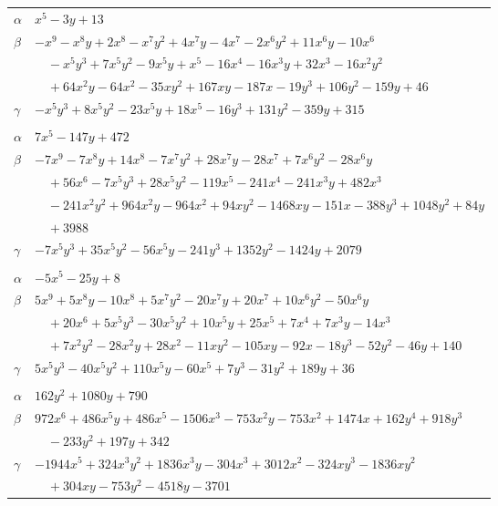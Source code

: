 \documentclass[11pt]{article}
\begin{document}
\begin{longtable}{@{}ll@{}}
$\alpha$ & $x^{5}-3y+13$\\
$\beta$ & $-x^{9}-x^{8}y+2x^{8}-x^{7}y^{2}+4x^{7}y-4x^{7}-2x^{6}y^{2}+11x^{6}y-10x^{6}$\\
 & $\quad -x^{5}y^{3}+7x^{5}y^{2}-9x^{5}y+x^{5}-16x^{4}-16x^{3}y+32x^{3}-16x^{2}y^{2}$\\
 & $\quad +64x^{2}y-64x^{2}-35xy^{2}+167xy-187x-19y^{3}+106y^{2}-159y+46$\\
$\gamma$ & $-x^{5}y^{3}+8x^{5}y^{2}-23x^{5}y+18x^{5}-16y^{3}+131y^{2}-359y+315$\\
\addlinespace[3pt]
\multicolumn{2}{@{}l}{$\{i,j\}=\{16,28\}$, $k_{ij}=2^{8}\cdot 3\cdot 11$}\\
$\alpha$ & $7x^{5}-147y+472$\\
$\beta$ & $-7x^{9}-7x^{8}y+14x^{8}-7x^{7}y^{2}+28x^{7}y-28x^{7}+7x^{6}y^{2}-28x^{6}y$\\
 & $\quad +56x^{6}-7x^{5}y^{3}+28x^{5}y^{2}-119x^{5}-241x^{4}-241x^{3}y+482x^{3}$\\
 & $\quad -241x^{2}y^{2}+964x^{2}y-964x^{2}+94xy^{2}-1468xy-151x-388y^{3}+1048y^{2}+84y$\\
 & $\quad +3988$\\
$\gamma$ & $-7x^{5}y^{3}+35x^{5}y^{2}-56x^{5}y-241y^{3}+1352y^{2}-1424y+2079$\\
\addlinespace[3pt]
\multicolumn{2}{@{}l}{$\{i,j\}=\{16,33\}$, $k_{ij}=2^{2}\cdot 3^{4}$}\\
$\alpha$ & $-5x^{5}-25y+8$\\
$\beta$ & $5x^{9}+5x^{8}y-10x^{8}+5x^{7}y^{2}-20x^{7}y+20x^{7}+10x^{6}y^{2}-50x^{6}y$\\
 & $\quad +20x^{6}+5x^{5}y^{3}-30x^{5}y^{2}+10x^{5}y+25x^{5}+7x^{4}+7x^{3}y-14x^{3}$\\
 & $\quad +7x^{2}y^{2}-28x^{2}y+28x^{2}-11xy^{2}-105xy-92x-18y^{3}-52y^{2}-46y+140$\\
$\gamma$ & $5x^{5}y^{3}-40x^{5}y^{2}+110x^{5}y-60x^{5}+7y^{3}-31y^{2}+189y+36$\\
\addlinespace[3pt]
\multicolumn{2}{@{}l}{$\{i,j\}=\{17,20\}$, $k_{ij}=2^{6}\cdot 7$}\\
$\alpha$ & $162y^{2}+1080y+790$\\
$\beta$ & $972x^{6}+486x^{5}y+486x^{5}-1506x^{3}-753x^{2}y-753x^{2}+1474x+162y^{4}+918y^{3}$\\
 & $\quad -233y^{2}+197y+342$\\
$\gamma$ & $-1944x^{5}+324x^{3}y^{2}+1836x^{3}y-304x^{3}+3012x^{2}-324xy^{3}-1836xy^{2}$\\
 & $\quad +304xy-753y^{2}-4518y-3701$\\

\end{longtable}
\end{document}
